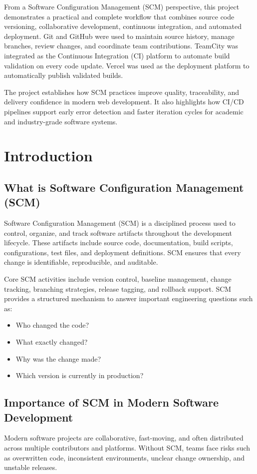 \documentclass[12pt,a4paper]{report}
\begin{document}
From a Software Configuration Management (SCM) perspective, this project demonstrates a practical and complete workflow that combines source code versioning, collaborative development, continuous integration, and automated deployment. Git and GitHub were used to maintain source history, manage branches, review changes, and coordinate team contributions. TeamCity was integrated as the Continuous Integration (CI) platform to automate build validation on every code update. Vercel was used as the deployment platform to automatically publish validated builds.

The project establishes how SCM practices improve quality, traceability, and delivery confidence in modern web development. It also highlights how CI/CD pipelines support early error detection and faster iteration cycles for academic and industry-grade software systems.

\chapter{Introduction}
\section{What is Software Configuration Management (SCM)}
Software Configuration Management (SCM) is a disciplined process used to control, organize, and track software artifacts throughout the development lifecycle. These artifacts include source code, documentation, build scripts, configurations, test files, and deployment definitions. SCM ensures that every change is identifiable, reproducible, and auditable.

Core SCM activities include version control, baseline management, change tracking, branching strategies, release tagging, and rollback support. SCM provides a structured mechanism to answer important engineering questions such as:
\begin{itemize}[leftmargin=1.2cm]
    \item Who changed the code?
    \item What exactly changed?
    \item Why was the change made?
    \item Which version is currently in production?
\end{itemize}

\section{Importance of SCM in Modern Software Development}
Modern software projects are collaborative, fast-moving, and often distributed across multiple contributors and platforms. Without SCM, teams face risks such as overwritten code, inconsistent environments, unclear change ownership, and unstable releases.
\end{document}
